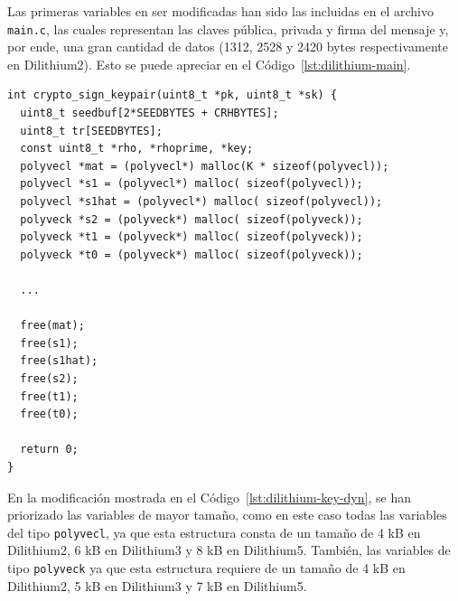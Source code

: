 Las primeras variables en ser modificadas han sido las incluidas en el archivo \texttt{main.c}, las cuales representan las claves pública, privada y firma del mensaje y, por ende, una gran cantidad de datos (1312, 2528 y 2420 bytes respectivamente en Dilithium2).
Esto se puede apreciar en el Código~\ref{lst:dilithium-main}.

\begin{lstlisting}[label={lst:dilithium-key-dyn},style=Cnice,firstnumber=1,caption={Modificación de la función \texttt{crypto\_sign\_keypair} en el archivo \texttt{Dilithium/main/src/sign.c}.}]
int crypto_sign_keypair(uint8_t *pk, uint8_t *sk) {
  uint8_t seedbuf[2*SEEDBYTES + CRHBYTES];
  uint8_t tr[SEEDBYTES];
  const uint8_t *rho, *rhoprime, *key;
  polyvecl *mat = (polyvecl*) malloc(K * sizeof(polyvecl));
  polyvecl *s1 = (polyvecl*) malloc( sizeof(polyvecl));
  polyvecl *s1hat = (polyvecl*) malloc( sizeof(polyvecl));
  polyveck *s2 = (polyveck*) malloc( sizeof(polyveck));
  polyveck *t1 = (polyveck*) malloc( sizeof(polyveck));
  polyveck *t0 = (polyveck*) malloc( sizeof(polyveck));

  ...

  free(mat);
  free(s1);
  free(s1hat);
  free(s2);
  free(t1);
  free(t0);

  return 0;
}
\end{lstlisting}

En la modificación mostrada en el Código~\ref{lst:dilithium-key-dyn}, se han priorizado las variables de mayor tamaño, como en este caso todas las variables del tipo \texttt{polyvecl}, ya que esta estructura consta de un tamaño de 4 kB en Dilithium2, 6 kB en Dilithium3 y 8 kB en Dilithium5.
También, las variables de tipo \texttt{polyveck} ya que esta estructura requiere de un tamaño de 4 kB en Dilithium2, 5 kB en Dilithium3 y 7 kB en Dilithium5.

